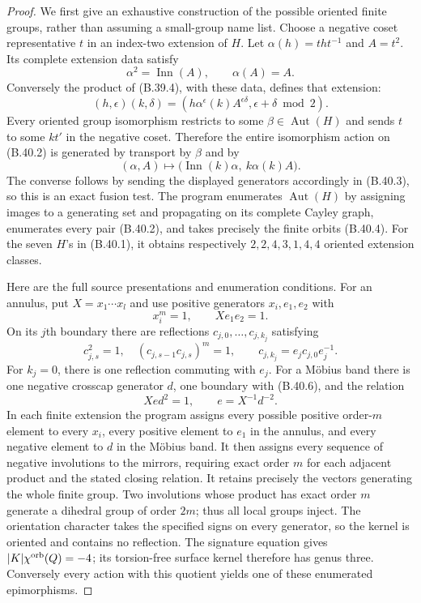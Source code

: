 \begin{proof}
We first give an exhaustive construction of the possible oriented
finite groups, rather than assuming a small-group name list.
Choose a negative coset representative $t$ in an index-two extension
of $H$.  Let $\alpha(h)=t h t^{-1}$ and $A=t^2$.  Its complete
extension data satisfy
\[
              \alpha^2=\operatorname{Inn}(A),\qquad
                          \alpha(A)=A.                 \tag{B.40.2}
\]
Conversely the product of (B.39.4), with these data, defines that
extension:
\[
 (h,\epsilon)(k,\delta)=
       (h\alpha^\epsilon(k)A^{\epsilon\delta},
                                  \epsilon+\delta\bmod2).
                                                        \tag{B.40.3}
\]
Every oriented group isomorphism restricts to some $\beta\in
\operatorname{Aut}(H)$ and sends $t$ to some $k t'$ in the negative
coset.  Therefore the entire isomorphism action on (B.40.2) is generated
by transport by $\beta$ and by
\[
       (\alpha,A)\longmapsto
       \bigl(\operatorname{Inn}(k)\alpha,\ k\alpha(k)A\bigr).
                                                        \tag{B.40.4}
\]
The converse follows by sending the displayed generators accordingly
in (B.40.3), so this is an exact fusion test.  The program enumerates
$\operatorname{Aut}(H)$ by assigning images to a generating set and
propagating on its complete Cayley graph, enumerates every pair
(B.40.2), and takes precisely the finite orbits (B.40.4).
For the seven $H$'s in (B.40.1), it obtains respectively
$2,2,4,3,1,4,4$ oriented extension classes.

Here are the full source presentations and enumeration conditions.
For an annulus, put $X=x_1\cdots x_l$ and use positive generators
$x_i,e_1,e_2$ with
\[
                x_i^m=1,\qquad X e_1e_2=1.             \tag{B.40.5}
\]
On its $j$th boundary there are reflections
$c_{j,0},\ldots,c_{j,k_j}$ satisfying
\[
 c_{j,s}^2=1,\quad(c_{j,s-1}c_{j,s})^m=1,\qquad
               c_{j,k_j}=e_j c_{j,0}e_j^{-1}.          \tag{B.40.6}
\]
For $k_j=0$, there is one reflection commuting with $e_j$.
For a M\"obius band there is one negative crosscap generator $d$,
one boundary with (B.40.6), and the relation
\[
                X e d^2=1,
                   \qquad e=X^{-1}d^{-2}.              \tag{B.40.7}
\]
In each finite extension the program assigns every possible positive
order-$m$ element to every $x_i$, every positive element to $e_1$
in the annulus, and every negative element to $d$ in the M\"obius
band.  It then assigns every sequence of negative involutions to
the mirrors, requiring exact order $m$ for each adjacent product
and the stated closing relation.  It retains precisely the vectors
generating the whole finite group.  Two involutions whose product
has exact order $m$ generate a dihedral group of order $2m$; thus
all local groups inject.  The orientation character takes the
specified signs on every generator, so the kernel is oriented and
contains no reflection.  The signature equation gives
$|K|\chi^{\rm orb}(Q)=-4$; its torsion-free surface kernel therefore
has genus three.  Conversely every action with this quotient yields
one of these enumerated epimorphisms.


\end{proof}
